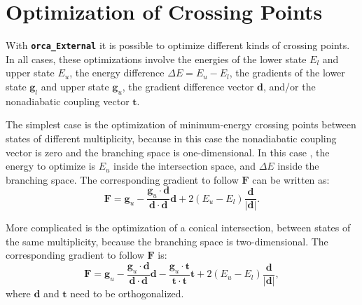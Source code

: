 \documentclass[a4paper,10pt,DIV=15,openany]{scrbook}
\newcommand{\ttt}[1]{\textbf{\texttt{#1}}}
\newcommand{\VEC}[1]{\ensuremath{\mathbf{#1}}}
\begin{document}

\section{Optimization of Crossing Points}\label{met:orcaopt}

With \ttt{orca\_External} it is possible to optimize different kinds of crossing points.
In all cases, these optimizations involve the energies of the lower state $E_l$ and upper state $E_u$, the energy difference $\Delta E=E_u-E_l$, the gradients of the lower state $\VEC{g}_l$ and upper state $\VEC{g}_u$, the gradient difference vector $\VEC{d}$, and/or the nonadiabatic coupling vector $\VEC{t}$.

The simplest case is the optimization of minimum-energy crossing points between states of different multiplicity, because in this case the nonadiabatic coupling vector is zero and the branching space is one-dimensional.
In this case \cite{Bearpark1994CPL}, the energy to optimize is $E_u$ inside the intersection space, and $\Delta E$ inside the branching space.
The corresponding gradient to follow $\VEC{F}$ can be written as:
\begin{equation}
  \VEC{F}=\VEC{g}_u-\frac{\VEC{g}_u\cdot\VEC{d}}{\VEC{d}\cdot\VEC{d}}\VEC{d}+2(E_u-E_l)\frac{\VEC{d}}{|\VEC{d}|}.
\end{equation}

More complicated is the optimization of a conical intersection, between states of the same multiplicity, because the branching space is two-dimensional.
The corresponding gradient to follow $\VEC{F}$ is:
\begin{equation}
  \VEC{F}=\VEC{g}_u
  -\frac{\VEC{g}_u\cdot\VEC{d}}{\VEC{d}\cdot\VEC{d}}\VEC{d}
  -\frac{\VEC{g}_u\cdot\VEC{t}}{\VEC{t}\cdot\VEC{t}}\VEC{t}
  +2(E_u-E_l)\frac{\VEC{d}}{|\VEC{d}|},
\end{equation}
where $\VEC{d}$ and $\VEC{t}$ need to be orthogonalized.
\end{document}
